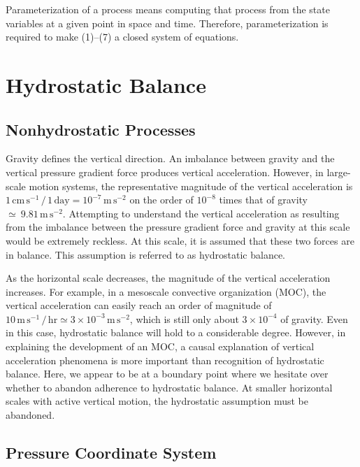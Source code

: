 \documentclass[12pt,openany]{book}
\begin{document}
Parameterization of a process means computing that process from the
state variables at a given point in space and time. 
Therefore, parameterization is required to make
(1)--(7) a closed system of equations.

\chapter{Hydrostatic Balance}

\section{Nonhydrostatic Processes}

Gravity defines the vertical direction. An imbalance between gravity
and the vertical pressure gradient force produces vertical
acceleration. However, in large-scale motion systems, the
representative magnitude of the vertical acceleration is $1\,\mathrm{cm}\,\mathrm{s}^{-1} \,/\, 1\,\mathrm{day}
= 10^{-7}\,\mathrm{m}\,\mathrm{s}^{-2}$ 
on the order of $10^{-8}$ times that of gravity $\simeq \ 9.81\,\mathrm{m}\,\mathrm{s}^{-2}$. Attempting to understand the
vertical acceleration as resulting from the imbalance between the
pressure gradient force and gravity at this scale would be extremely
reckless. At this scale, it is assumed that these two forces are in
balance. This assumption is referred to as hydrostatic balance.

As the horizontal scale decreases, the magnitude of the vertical
acceleration increases. For example, in a mesoscale convective
organization (MOC), the vertical acceleration can easily reach an
order of magnitude of $10\,\mathrm{m}\,\mathrm{s}^{-1} \,/\, \mathrm{hr}
\simeq 3 \times 10^{-3}\,\mathrm{m}\,\mathrm{s}^{-2}$, which is still only about
$3 \times 10^{-4}$ of gravity. Even in this case, hydrostatic balance
will hold to a considerable degree. However, in explaining the
development of an MOC, a causal explanation of vertical acceleration
phenomena is more important than recognition of hydrostatic balance.
Here, we appear to be at a boundary point where we hesitate over
whether to abandon adherence to hydrostatic balance. At smaller
horizontal scales with active vertical motion, the hydrostatic
assumption must be abandoned.

\section{Pressure Coordinate System}
\end{document}
